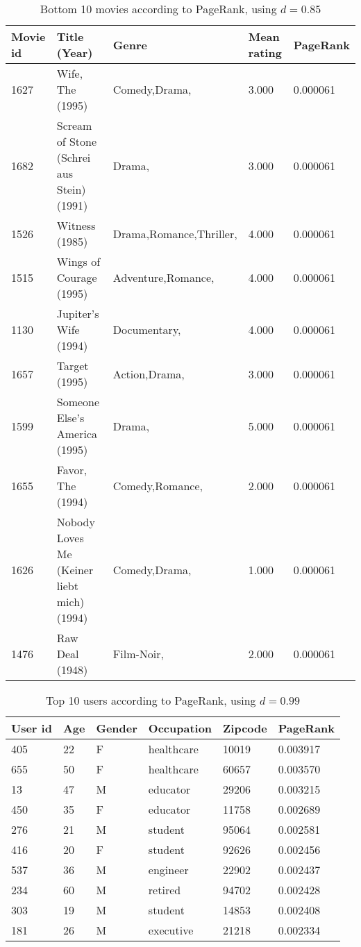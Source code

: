 \begin{table}[!htbp]
\hspace{-2cm}
\begin{tabular}{lllll}
Movie id & Title (Year) & Genre & Mean rating & PageRank \\
\hline
1627 & Wife, The (1995) & Comedy,Drama, & 3.000 & 0.000061 \\
1682 & Scream of Stone (Schrei aus Stein) (1991) & Drama, & 3.000 & 0.000061 \\
1526 & Witness (1985) & Drama,Romance,Thriller, & 4.000 & 0.000061 \\
1515 & Wings of Courage (1995) & Adventure,Romance, & 4.000 & 0.000061 \\
1130 & Jupiter's Wife (1994) & Documentary, & 4.000 & 0.000061 \\
1657 & Target (1995) & Action,Drama, & 3.000 & 0.000061 \\
1599 & Someone Else's America (1995) & Drama, & 5.000 & 0.000061 \\
1655 & Favor, The (1994) & Comedy,Romance, & 2.000 & 0.000061 \\
1626 & Nobody Loves Me (Keiner liebt mich) (1994) & Comedy,Drama, & 1.000 & 0.000061 \\
1476 & Raw Deal (1948) & Film-Noir, & 2.000 & 0.000061 \\
\end{tabular}
\caption{Bottom 10 movies according to PageRank, using $d = 0.85$}
\label{tab:q49bottom10md85}
\end{table}

\begin{table}[!htbp]
\centering
\begin{tabular}{llllll}
User id & Age & Gender & Occupation & Zipcode & PageRank \\
\hline
405 & 22 & F & healthcare & 10019 & 0.003917 \\
655 & 50 & F & healthcare & 60657 & 0.003570 \\
13 & 47 & M & educator & 29206 & 0.003215 \\
450 & 35 & F & educator & 11758 & 0.002689 \\
276 & 21 & M & student & 95064 & 0.002581 \\
416 & 20 & F & student & 92626 & 0.002456 \\
537 & 36 & M & engineer & 22902 & 0.002437 \\
234 & 60 & M & retired & 94702 & 0.002428 \\
303 & 19 & M & student & 14853 & 0.002408 \\
181 & 26 & M & executive & 21218 & 0.002334 \\
\end{tabular}
\caption{Top 10 users according to PageRank, using $d = 0.99$}
\label{tab:q49top10ud99}
\end{table}

